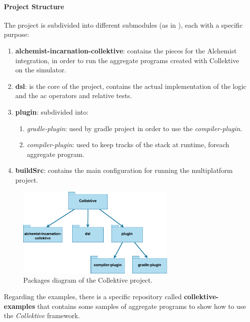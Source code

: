 \paragraph{Project Structure}
The project is subdivided into different submodules (as in ), each with a specific purpose:

\begin{enumerate}
    \item \textbf{alchemist-incarnation-collektive}: contains the pieces for the Alchemist integration,
        in order to run the aggregate programs created with Collektive on the simulator.
    \item \textbf{dsl}: is the core of the project, contains the actual implementation of the logic and the \ac{ac} operators
        and relative tests.
    \item \textbf{plugin}: subdivided into:
        \begin{enumerate}
            \item \emph{gradle-plugin}: used by gradle project in order to use the \emph{compiler-plugin}.
            \item \emph{compiler-plugin}: used to keep tracks of the stack at runtime, foreach aggregate program.
        \end{enumerate}
    \item \textbf{buildSrc}: contains the main configuration for running the multiplatform project.
\end{enumerate}

\begin{figure}[h!]
    \centering
    \includegraphics[width=0.7\textwidth]{figures/packages}
    \caption{Packages diagram of the Collektive project.}
    \label{fig:pacakges}
\end{figure}

Regarding the examples, there is a specific repository called \textbf{collektive-examples} that contains some samples of
aggregate programs to show how to use the \emph{Collektive} framework.


